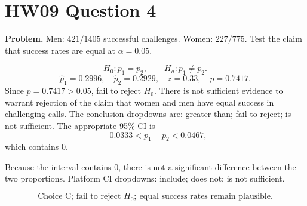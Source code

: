 \documentclass[11pt]{article}
\begin{document}
\section*{HW09 Question 4}

\textbf{Problem.} Men: \(421/1405\) successful challenges. Women: \(227/775\). Test the claim that success rates are equal at \(\alpha=0.05\).

\[
H_0:p_1=p_2,\qquad H_a:p_1\ne p_2.
\]
\[
\hat p_1=0.2996,\quad \hat p_2=0.2929,\quad z=0.33,\quad p=0.7417.
\]
Since \(p=0.7417>0.05\), fail to reject \(H_0\). There is not sufficient evidence to warrant rejection of the claim that women and men have equal success in challenging calls. The conclusion dropdowns are: greater than; fail to reject; is not sufficient. The appropriate 95\% CI is
\[
-0.0333<p_1-p_2<0.0467,
\]
which contains 0.

Because the interval contains 0, there is not a significant difference between the two proportions.
Platform CI dropdowns: include; does not; is not sufficient.

\[
\boxed{\text{Choice C; fail to reject }H_0;\ \text{equal success rates remain plausible.}}
\]
\end{document}
